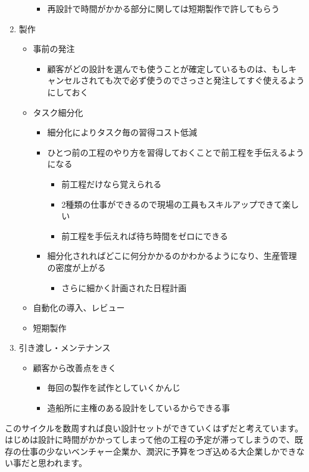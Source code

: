 \documentclass[dvipdfmx,a4paper]{jsarticle}
\begin{document}
\begin{enumerate}
\begin{itemize}
\begin{itemize}
            \item 再設計で時間がかかる部分に関しては短期製作で許してもらう
        \end{itemize}
    \end{itemize}
    \item 製作
    \begin{itemize}
        \item 事前の発注
        \begin{itemize}
            \item 顧客がどの設計を選んでも使うことが確定しているものは、もしキャンセルされても次で必ず使うのでさっさと発注してすぐ使えるようにしておく
        \end{itemize}
    \end{itemize}
    \begin{itemize}
        \item タスク細分化
        \begin{itemize}
            \item 細分化によりタスク毎の習得コスト低減
            \item ひとつ前の工程のやり方を習得しておくことで前工程を手伝えるようになる
            \begin{itemize}
                \item 前工程だけなら覚えられる
                \item 2種類の仕事ができるので現場の工員もスキルアップできて楽しい
                \item 前工程を手伝えれば待ち時間をゼロにできる
            \end{itemize}
            \item 細分化されればどこに何分かかるのかわかるようになり、生産管理の密度が上がる
            \begin{itemize}
                \item さらに細かく計画された日程計画
            \end{itemize}
        \end{itemize}
        \item 自動化の導入、レビュー
        \item 短期製作
    \end{itemize}
    \item 引き渡し・メンテナンス
    \begin{itemize}
        \item 顧客から改善点をきく
        \begin{itemize}
            \item 毎回の製作を試作としていくかんじ
            \item 造船所に主権のある設計をしているからできる事
        \end{itemize}
    \end{itemize}
\end{enumerate}
このサイクルを数周すれば良い設計セットができていくはずだと考えています。\\
はじめは設計に時間がかかってしまって他の工程の予定が滞ってしまうので、既存の仕事の少ないベンチャー企業か、潤沢に予算をつぎ込める大企業しかできない事だと思われます。
\end{document}
